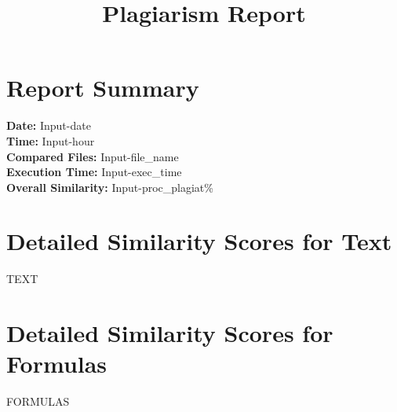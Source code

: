 \documentclass[12pt]{article}
\title{Plagiarism Report}
\begin{document}
\maketitle
\section*{Report Summary}
\textbf{Date:} Input-date\\
\textbf{Time:} Input-hour\\
\textbf{Compared Files:} Input-file_name\\
\textbf{Execution Time:} Input-exec_time\\
\textbf{Overall Similarity:} Input-proc_plagiat\%

\section*{Detailed Similarity Scores for Text}
\begin{enumerate}
TEXT
\end{enumerate}

\section*{Detailed Similarity Scores for Formulas}
\begin{enumerate}
FORMULAS
\end{enumerate}
\end{document}
